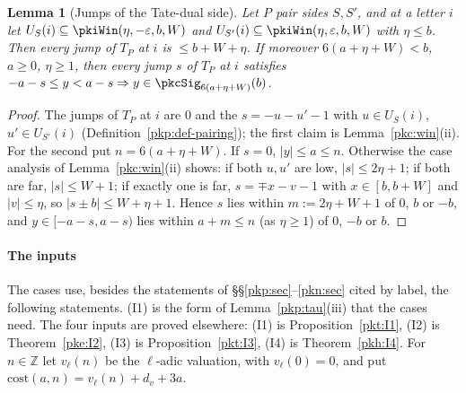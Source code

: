 \documentclass[10pt]{amsart}
\newtheorem{lemma}[theorem]{Lemma}
\theoremstyle{definition}
\theoremstyle{remark}
\newcommand{\Z}{\mathbb Z}
\begin{document}
\begin{lemma}[Jumps of the Tate-dual side]\label{pkc:dualjumps}
Let $P$ pair sides $S,S'$, and at a letter $i$ let $U_S(i)\subseteq\pkiWin(\eta,-\varepsilon,b,W)$ and
$U_{S'}(i)\subseteq\pkiWin(\eta,\varepsilon,b,W)$ with $\eta\le b$. Then every jump of $T_P$ at $i$ is
$\le b+W+\eta$. If moreover $6(a+\eta+W)<b$, $a\ge0$, $\eta\ge1$, then every jump $s$ of $T_P$ at $i$
satisfies $-a-s\le y<a-s\Rightarrow y\in\pkcSig_{6(a+\eta+W)}(b)$.
\end{lemma}

\begin{proof}
The jumps of $T_P$ at $i$ are $0$ and the $s=-u-u'-1$ with $u\in U_S(i)$, $u'\in U_{S'}(i)$
(Definition~\ref{pkp:def-pairing}); the first claim is Lemma~\ref{pkc:win}(ii). For the second put
$n=6(a+\eta+W)$. If $s=0$, $|y|\le a\le n$. Otherwise the case analysis of Lemma~\ref{pkc:win}(ii)
shows: if both $u,u'$ are low, $|s|\le2\eta+1$; if both are far, $|s|\le W+1$; if exactly one is far,
$s=\mp x-v-1$ with $x\in[b,b+W]$ and $|v|\le\eta$, so $|s\pm b|\le W+\eta+1$. Hence $s$ lies within
$m:=2\eta+W+1$ of $0$, $b$ or $-b$, and $y\in[-a-s,a-s)$ lies within $a+m\le n$ (as $\eta\ge1$) of
$0$, $-b$ or $b$.
\end{proof}

\paragraph*{The inputs}

The cases use, besides the statements of \S\S\ref{pkp:sec}--\ref{pkn:sec} cited by label, the following
statements. (I1) is the form of Lemma~\ref{pkp:tau}(iii) that the cases need. The four inputs are proved
elsewhere: (I1) is Proposition~\ref{pkt:I1}, (I2) is Theorem~\ref{pke:I2}, (I3) is
Proposition~\ref{pkt:I3}, (I4) is Theorem~\ref{pkh:I4}. For $n\in\Z$ let $v_\ell(n)$ be the $\ell$-adic valuation, with
$v_\ell(0)=0$, and put $\mathrm{cost}(a,n)=v_\ell(n)+d_v+3a$.
\end{document}

